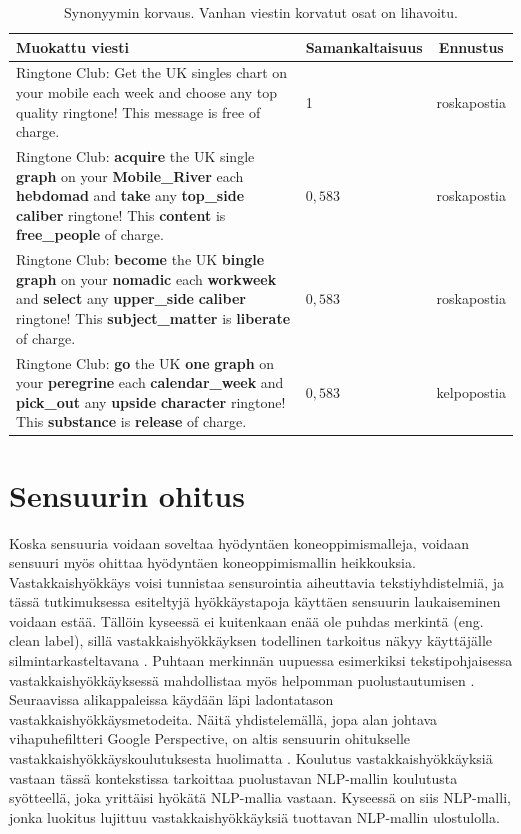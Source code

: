\begin{table}[t]
  \begin{tabularx}{\textwidth}{| >{\raggedright\arraybackslash}X | l | c |}
    \hline
    Muokattu viesti & Samankaltaisuus & Ennustus\\
    \hline
    Ringtone Club: Get the UK singles chart on your mobile each week and choose any top quality ringtone! This message is free of charge. & 1 & roskapostia\\
    \hline
    Ringtone Club: \textbf{acquire} the UK single \textbf{graph} on your \textbf{Mobile\_River} each \textbf{hebdomad} and \textbf{take} any \textbf{top\_side} \textbf{caliber} ringtone! This \textbf{content} is \textbf{free\_people} of charge. & $0,583$ & roskapostia\\
    \hline
    Ringtone Club: \textbf{become} the UK \textbf{bingle} \textbf{graph} on your \textbf{nomadic} each \textbf{workweek} and \textbf{select} any \textbf{upper\_side} \textbf{caliber} ringtone! This \textbf{subject\_matter} is \textbf{liberate} of charge. & $0,583$ & roskapostia \\
    \hline
    Ringtone Club: \textbf{go} the UK \textbf{one} \textbf{graph} on your \textbf{peregrine} each \textbf{calendar\_week} and \textbf{pick\_out} any \textbf{upside} \textbf{character} ringtone! This \textbf{substance} is \textbf{release} of charge. & $0,583$ & kelpopostia \\
    \hline
  \end{tabularx}
  \caption{Synonyymin korvaus. Vanhan viestin korvatut osat on lihavoitu. \citep{spamfilter}}
\end{table}

\section{Sensuurin ohitus}
Koska sensuuria voidaan soveltaa hyödyntäen koneoppimismalleja, voidaan sensuuri myös ohittaa hyödyntäen koneoppimismallin heikkouksia. Vastakkaishyökkäys voisi tunnistaa sensurointia aiheuttavia tekstiyhdistelmiä, ja tässä tutkimuksessa esiteltyjä hyökkäystapoja käyttäen sensuurin laukaiseminen voidaan estää. Tällöin kyseessä ei kuitenkaan enää ole puhdas merkintä (eng. clean label), sillä vastakkaishyökkäyksen todellinen tarkoitus näkyy käyttäjälle silmintarkasteltavana \citep{triggerless}. Puhtaan merkinnän uupuessa esimerkiksi tekstipohjaisessa vastakkaishyökkäyksessä mahdollistaa myös helpomman puolustautumisen \citep{pruthi2019}. Seuraavissa alikappaleissa käydään läpi ladontatason vastakkaishyökkäysmetodeita. Näitä yhdistelemällä, jopa alan johtava vihapuhefiltteri Google Perspective, on altis sensuurin ohitukselle vastakkaishyökkäyskoulutuksesta huolimatta \citep{hatespeech}. Koulutus vastakkaishyökkäyksiä vastaan tässä kontekstissa tarkoittaa puolustavan NLP-mallin koulutusta syötteellä, joka yrittäisi hyökätä NLP-mallia vastaan. Kyseessä on siis NLP-malli, jonka luokitus lujittuu vastakkaishyökkäyksiä tuottavan NLP-mallin ulostulolla.

